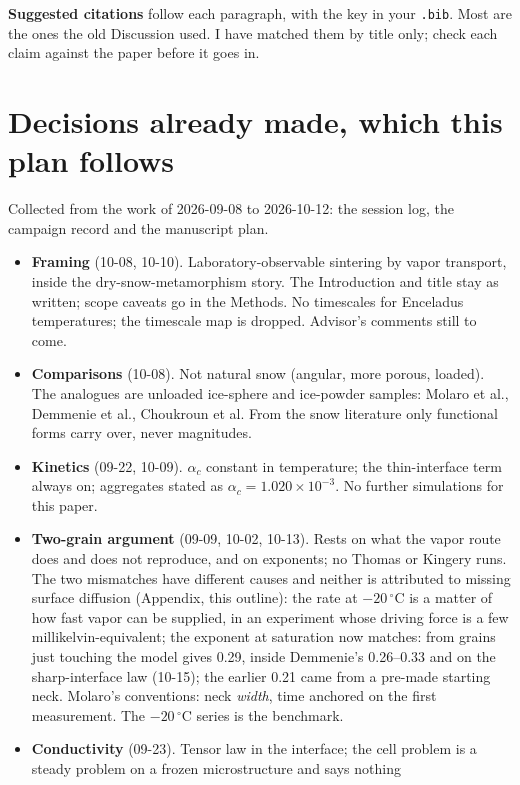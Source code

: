 \documentclass[11pt]{article}
\begin{document}
\textbf{Suggested citations} follow each paragraph, with the key in your
\texttt{.bib}. Most are the ones the old Discussion used. I have matched them
by title only; check each claim against the paper before it goes in.

\section*{Decisions already made, which this plan follows}

Collected from the work of 2026-09-08 to 2026-10-12: the session log, the
campaign record and the manuscript plan.
\begin{itemize}
\item \textbf{Framing} (10-08, 10-10). Laboratory-observable sintering by
  vapor transport, inside the dry-snow-metamorphism story. The Introduction
  and title stay as written; scope caveats go in the Methods. No timescales
  for Enceladus temperatures; the timescale map is dropped. Advisor's
  comments still to come.
\item \textbf{Comparisons} (10-08). Not natural snow (angular, more porous,
  loaded). The analogues are unloaded ice-sphere and ice-powder samples:
  Molaro et al., Demmenie et al., Choukroun et al. From the snow literature
  only functional forms carry over, never magnitudes.
\item \textbf{Kinetics} (09-22, 10-09). $\alpha_c$ constant in temperature;
  the thin-interface term always on; aggregates stated as $\alpha_c = 1.020
  \times 10^{-3}$. No further simulations for this paper.
\item \textbf{Two-grain argument} (09-09, 10-02, 10-13). Rests on what the
  vapor route does and does not reproduce, and on exponents; no Thomas or
  Kingery runs. The two mismatches have different causes and neither is
  attributed to missing surface diffusion (Appendix, this outline): the rate
  at $-20\,^{\circ}$C is a matter of how fast vapor can be supplied, in an
  experiment whose driving force is a few millikelvin-equivalent; the
  exponent at saturation now matches: from grains just touching the model
  gives 0.29, inside Demmenie's 0.26--0.33 and on the sharp-interface law
  (10-15); the earlier 0.21 came from a pre-made starting neck. Molaro's conventions: neck \emph{width}, time anchored on the first
  measurement. The $-20\,^{\circ}$C series is the benchmark.
\item \textbf{Conductivity} (09-23). Tensor law in the interface; the cell
  problem is a steady problem on a frozen microstructure and says nothing

\end{itemize}
\end{document}
